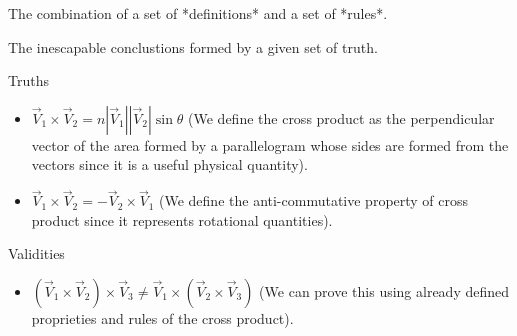 \begin{definition}[Truth]
    The combination of a set of *definitions* and a set of *rules*.
\end{definition}
\begin{definition}[Validity]
    The inescapable conclustions formed by a given set of truth.
\end{definition}

\begin{example}
    Truths
    \begin{itemize}
        \item $\vec{V}_{1}\times \vec{V}_{2}=n|\vec{V}_{1}||\vec{V}_{2}|\sin\theta$ (We define the cross product as the perpendicular vector of the area formed by a parallelogram whose sides are formed from the vectors since it is a useful physical quantity).
        \item $\vec{V}_{1}\times \vec{V}_{2}=-\vec{V}_{2}\times \vec{V}_{1}$ (We define the anti-commutative property of cross product since it represents rotational quantities).
    \end{itemize}
\end{example}
\begin{example}
    Validities
    \begin{itemize}
        \item $(\vec{V}_{1}\times \vec{V}_{2})\times \vec{V}_{3}\not=\vec{V}_{1}\times (\vec{V}_{2}\times \vec{V}_{3})$ (We can prove this using already defined proprieties and rules of the cross product).
    \end{itemize}
\end{example}

\newpage
